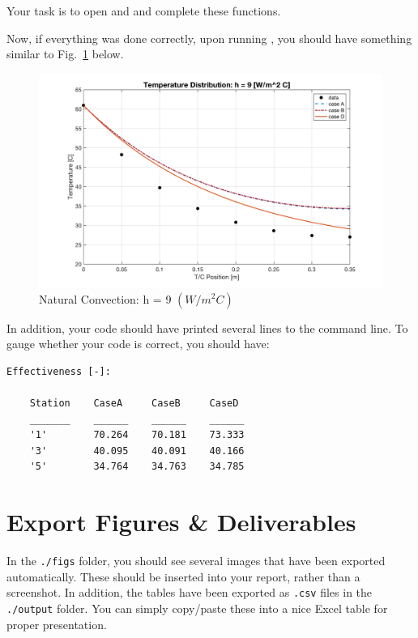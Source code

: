 \documentclass[11pt, letterpaper]{article}
\begin{document}
\n
Your task is to open  and  and complete these functions.
\n

\n
Now, if everything was done correctly, upon running , you should have something similar to Fig.~\ref{fig1} below.

\begin{figure}[H]
    \begin{center}
        \includegraphics[width=125mm]{gfx/h09.png}
    \caption{Natural Convection: h = 9 $(W/m^2 C)$}\label{fig1}
    \end{center}
\end{figure}

\n
In addition, your code should have printed several lines to the command line. To gauge whether your code is correct, you should have:

\begin{lstlisting}[numbers=none]
 Effectiveness [-]:
 
    Station    CaseA     CaseB     CaseD 
    _______    ______    ______    ______
    '1'        70.264    70.181    73.333
    '3'        40.095    40.091    40.166
    '5'        34.764    34.763    34.785

\end{lstlisting}


\n
\section{Export Figures \& Deliverables}
In the \texttt{./figs} folder, you should see several images that have been exported automatically. These should be inserted into your report, rather than a screenshot. In addition, the tables have been exported as \texttt{.csv} files in the \texttt{./output} folder. You can simply copy/paste these into a nice Excel table for proper presentation.
\end{document}
